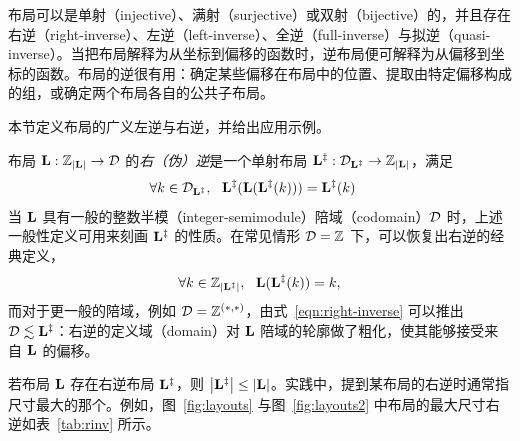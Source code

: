 \label{sec:inverse}

布局可以是单射（injective）、满射（surjective）或双射（bijective）的，并且存在右逆（right-inverse）、左逆（left-inverse）、全逆（full-inverse）与拟逆（quasi-inverse）。当把布局解释为从坐标到偏移的函数时，逆布局便可解释为从偏移到坐标的函数。布局的逆很有用：确定某些偏移在布局中的位置、提取由特定偏移构成的组，或确定两个布局各自的公共子布局。

本节定义布局的广义左逆与右逆，并给出应用示例。


布局 $\mathbf{L} : \mathbb{Z}_{\left| {\mathbf{L}} \right|} \to \mathcal{D}$ 的{\em 右（伪）逆}是一个单射布局 $\mathbf{L}^{\ddagger} : \mathcal{D}_{\mathbf{L}^{\ddagger}} \to \mathbb{Z}_{\left| {\mathbf{L}} \right|}$，满足
\begin{align}
\forall k \in \D_{\v{L}^{\ddagger}}, \ \ \v{L}^\ddagger(\v{L}(\v{L}^\ddagger(k))) &= \v{L}^\ddagger(k)
\label{eqn:right-inverse}
\end{align}
当 $\mathbf{L}$ 具有一般的整数半模（integer-semimodule）陪域（codomain）$\mathcal{D}$ 时，上述一般性定义可用来刻画 $\mathbf{L}^{\ddagger}$ 的性质。在常见情形 $\mathcal{D} = \mathbb{Z}$ 下，可以恢复出右逆的经典定义，
\begin{align*}
\forall k \in \Z_{\abs{\v{L}^{\ddagger}}}, \ \ \v{L}(\v{L}^{\ddagger}(k)) = k,
\end{align*}
而对于更一般的陪域，例如 $\mathcal{D} = \mathbb{Z}^{(\ast,\ast)}$，由式~\eqref{eqn:right-inverse} 可以推出 $\mathcal{D} \lesssim \mathbf{L}^\ddagger$：右逆的定义域（domain）对 $\mathbf{L}$ 陪域的轮廓做了粗化，使其能够接受来自 $\mathbf{L}$ 的偏移。

若布局 $\mathbf{L}$ 存在右逆布局 $\mathbf{L}^\ddagger$，则 $\left| {\mathbf{L}^\ddagger} \right| \leq \left| {\mathbf{L}} \right|$。实践中，提到某布局的右逆时通常指尺寸最大的那个。例如，图~\ref{fig:layouts} 与图~\ref{fig:layouts2} 中布局的最大尺寸右逆如表~\ref{tab:rinv} 所示。

